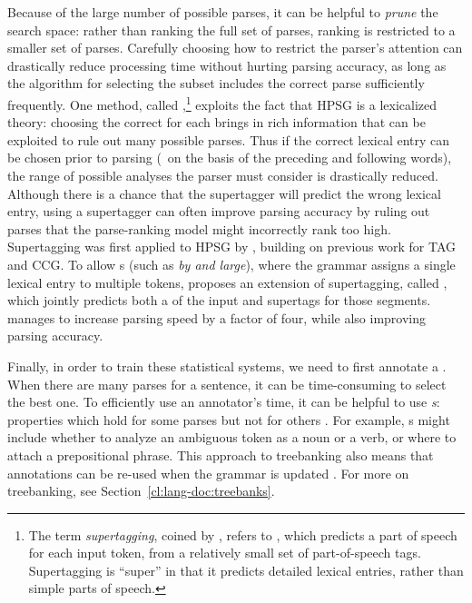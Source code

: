 \documentclass[output=paper
 	        ,biblatex
                ,babelshorthands
                ,newtxmath
                ,draftmode
                ,colorlinks, citecolor=brown
]{langscibook}
\begin{document}
Because of the large number of possible parses,
it can be helpful to \textit{prune} the search space:
rather than ranking the full set of parses,
ranking is restricted to a smaller set of parses.
Carefully choosing how to restrict the parser's attention 
can drastically reduce processing time without hurting parsing accuracy,
as long as the algorithm for selecting the subset
includes the correct parse sufficiently frequently.
One method, called \textit{},\footnote{%
	The term \textit{supertagging}, coined by \citet{bangalore1999supertag},
	refers to \textit{},
	which predicts a part of speech for each input token,
	from a relatively small set of part-of-speech tags.
	Supertagging is ``super'' in that it predicts detailed lexical entries,
	rather than simple parts of speech.
}
exploits the fact that HPSG is a lexicalized theory:
choosing the correct  for each  brings in rich information
that can be exploited to rule out many possible parses.
Thus if the correct lexical entry can be chosen prior to parsing
(\eg\ on the basis of the preceding and following words),
the range of possible analyses the parser must consider is drastically reduced.
Although there is a chance that the supertagger will predict the wrong lexical entry,
using a supertagger can often improve parsing accuracy
by ruling out parses that the parse-ranking model might incorrectly rank too high.
Supertagging was first applied to HPSG by \citet{matsuzaki2007supertag},
building on previous work for TAG \citep{bangalore1999supertag}
and CCG\indexccg \citep{clark2004supertag}.
To allow s (such as \textit{by and large}),
where the grammar assigns a single lexical entry to multiple tokens,
\citet{dridan2013ubertag} proposes an extension of supertagging, called \textit{},
which jointly predicts both a  of the input and supertags for those segments.
\citeauthor{dridan2013ubertag} manages to increase parsing speed by a factor of four,
while also improving parsing accuracy.


Finally, in order to train these statistical systems,
we need to first annotate a .
When there are many parses for a sentence,
it can be time-consuming to select the best one.
To efficiently use an annotator's time,
it can be helpful to use \textit{s}:
properties which hold for some parses but not for others \citep{Carter:97}.
For example, s might include
whether to analyze an ambiguous token as a noun or a verb,
or where to attach a prepositional phrase.
This approach to treebanking also means that
annotations can be re-used when the grammar is updated
\citep{OFTM2004a-u,Fli:Oep:Ben:17}.
For more on treebanking, see Section~\ref{cl:lang-doc:treebanks}.%
\end{document}
